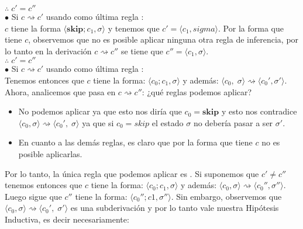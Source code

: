 \documentclass[11pt, fleqn]{article}
\begin{document}
$\therefore \; c' = c''$ \\



$\bullet$ Si $ c \rightsquigarrow c' $ usando como última regla : \\
$c$ tiene la forma $\langle \textbf{skip};c_1, \sigma \rangle$ y tenemos que $c' = \langle c_1, sigma \rangle$.
Por la forma que tiene $c$, observemos que no es posible aplicar ninguna otra regla
de inferencia, por lo tanto en la derivación $ c \rightsquigarrow c'' $ se tiene que
$c'' = \langle c_1, \sigma \rangle$. \\

$\therefore \; c' = c''$ \\


$\bullet$ Si $ c \rightsquigarrow c' $ usando como última regla : \\
Tenemos entonces que $c$ tiene la forma: $\langle c_0;c_1, \sigma \rangle$ y
además:  $ \langle c_0, \; \sigma \rangle \rightsquigarrow \langle c_0', \sigma' \rangle$.
Ahora, analicemos que pasa en $ c \rightsquigarrow c'' $: ¿qué reglas podemos aplicar?

\begin{itemize}
      \item No podemos aplicar  ya que esto nos diría que $c_0 = \textbf{skip}$ y esto
            nos contradice $ \langle c_0, \sigma \rangle \rightsquigarrow \langle c_0', \; \sigma \rangle$ ya que
            si $c_0 = skip$ el estado $\sigma$ no debería pasar a ser $\sigma'$.
      \item En cuanto a las demás reglas, es claro que por la forma que tiene $c$ no es
            posible aplicarlas.
\end{itemize}

Por lo tanto, la única regla que podemos aplicar es . Si suponemos que 
$c' \neq c''$ tenemos entonces que $c$ tiene la forma: $\langle c_0;c_1,\sigma \rangle$ y
además:  $ \langle c_0, \sigma \rangle \rightsquigarrow \langle c_0'', \sigma'' \rangle$.
Luego sigue que $c''$ tiene la forma: $ \langle c_0'';c1, \sigma'' \rangle$.
Sin embargo, observemos que $ \langle c_0, \sigma \rangle \rightsquigarrow \langle c_0', \; \sigma' \rangle$
es una subderivación y por lo tanto vale nuestra Hipótesis Inductiva, es decir necesariamente:
\end{document}
